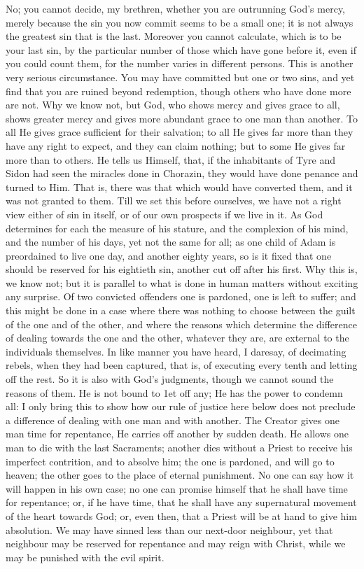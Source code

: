 No; you cannot decide, my brethren, whether you are outrunning
God's mercy, merely because the sin you now commit seems to be a small
one; it is not always the greatest sin that is the last. Moreover you
cannot calculate, which is to be your last sin, by the particular
number of those which have gone before it, even if you could count
them, for the number varies in different persons. This is another very
serious circumstance. You may have committed but one or two sins, and
yet find that you are ruined beyond redemption, though others who have
done more are not. Why we know not, but God, who shows mercy and gives
grace to all, shows greater mercy and gives more abundant grace to one
man than another. To all He gives grace sufficient for their
salvation; to all He gives far more than they have any right to expect, and they can claim nothing; but to some He gives far more than
to others. He tells us Himself, that, if the inhabitants of Tyre and
Sidon had seen the miracles done in Chorazin, they would have done
penance and turned to Him. That is, there was that which would have
converted them, and it was not granted to them. Till we set this
before ourselves, we have not a right view either of sin in itself, or
of our own prospects if we live in it. As God determines for each the
measure of his stature, and the complexion of his mind, and the number
of his days, yet not the same for all; as one child of Adam is
preordained to live one day, and another eighty years, so is it fixed
that one should be reserved for his eightieth sin, another cut off
after his first. Why this is, we know not; but it is parallel to what
is done in human matters without exciting any surprise. Of two
convicted offenders one is pardoned, one is left to suffer; and this
might be done in a case where there was nothing to choose between the
guilt of the one and of the other, and where the reasons which
determine the difference of dealing towards the one and the other,
whatever they are, are external to the individuals themselves. In like
manner you have heard, I daresay, of decimating rebels, when they had
been captured, that is, of executing every tenth and letting off the
rest. So it is also with God's judgments, though we cannot sound the
reasons of them. He is not bound to 1et off any; He has the power to
condemn all: I only bring this to show how our rule of justice here
below does not preclude a difference of dealing with one man and with
another. The Creator gives one man time for repentance, He carries off
another by sudden death. He allows one man to die with the last
Sacraments; another dies without a Priest to receive his imperfect
contrition, and to absolve him; the one is pardoned, and will go to
heaven; the other goes to the place of eternal punishment. No one can
say how it will happen in his own case; no one can promise himself
that he shall have time for repentance; or, if he have time, that he
shall have any supernatural movement of the heart towards God; or,
even then, that a Priest will be at hand to give him absolution. We
may have sinned less than our next-door neighbour, yet that neighbour
may be reserved for repentance and may reign with Christ, while we may
be punished with the evil spirit.

